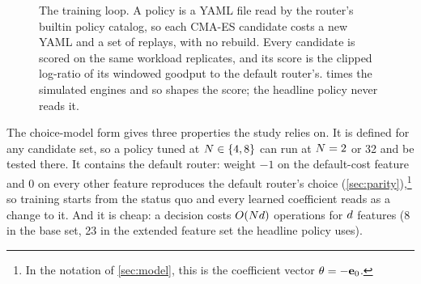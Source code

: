 \begin{figure}[htbp]
  \centering
  \caption{The training loop. A policy is a YAML file read by the router's builtin policy catalog,
    so each CMA-ES candidate costs a new YAML and a set of replays, with no rebuild. Every candidate
    is scored on the same workload replicates, and its score is the clipped log-ratio of its
    windowed goodput to the default router's. \ais{} times the simulated engines and so shapes the
    score; the headline policy never reads it.}
  \label{fig:loop}
\end{figure}

The choice-model form gives three properties the study relies on. It is defined for any candidate
set, so a policy tuned at $N \in \{4, 8\}$ can run at $N = 2$ or 32 and be tested there. It
contains the default router: weight $-1$ on the default-cost feature and 0 on every other feature
reproduces the default router's choice (\cref{sec:parity}),\footnote{In the notation of
  \cref{sec:model}, this is the coefficient vector $\theta = -\mathbf{e}_{0}$.} so training starts from
the status quo and every learned coefficient reads as a change to it. And it is cheap: a decision
costs $O(Nd)$ operations for $d$ features (8 in the base set, 23 in the extended feature
set the headline policy uses).

